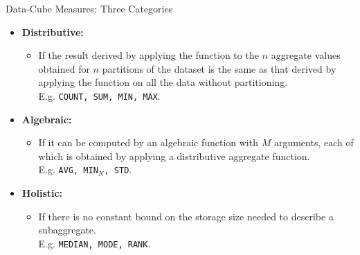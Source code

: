 \begin{frame}{Data-Cube Measures: Three Categories}
  \begin{itemize}
  \item \textbf{Distributive:}
    \begin{itemize}
    \item If the result derived by applying the function to the $n$ aggregate values obtained for $n$ partitions of the dataset is the same as that derived by applying the function on all the data without partitioning.\\
      E.g. \texttt{COUNT, SUM, MIN, MAX}.
    \end{itemize}
  \item \textbf{Algebraic:}
    \begin{itemize}
    \item If it can be computed by an algebraic function with $M$ arguments, each of which is obtained by applying a distributive aggregate function.\\
      E.g. \texttt{AVG, MIN$_N$, STD}.
    \end{itemize}
  \item \textbf{Holistic:}
    \begin{itemize}
    \item If there is no constant bound on the storage size needed to describe a subaggregate.\\
      E.g. \texttt{MEDIAN, MODE, RANK}.
    \end{itemize}
  \end{itemize}
\end{frame}

